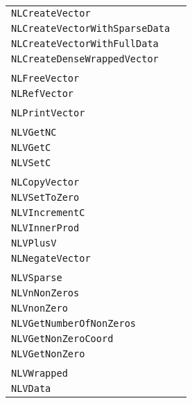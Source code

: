 \documentclass[12pt]{article}
\begin{document}
\begin{center}
\begin{tabular}{ll}
\tt NLCreateVector&\pageref{Subroutine:NLCreateVector}\\
\tt NLCreateVectorWithSparseData&\pageref{Subroutine:NLCreateVectorWithSparseData}\\
\tt NLCreateVectorWithFullData&\pageref{Subroutine:NLCreateVectorWithFullData}\\
\tt NLCreateDenseWrappedVector&\pageref{Subroutine:NLCreateDenseWrappedVector}\\
\\
\tt NLFreeVector&\pageref{Subroutine:NLFreeVector}\\
\tt NLRefVector&\pageref{Subroutine:NLRefVector}\\
\\
\tt NLPrintVector&\pageref{Subroutine:NLPrintVector}\\
\\
\tt NLVGetNC&\pageref{Subroutine:NLVGetNC}\\
\tt NLVGetC&\pageref{Subroutine:NLVGetC}\\
\tt NLVSetC&\pageref{Subroutine:NLVSetC}\\
\\
\tt NLCopyVector&\pageref{Subroutine:NLCopyVector}\\
\tt NLVSetToZero&\pageref{Subroutine:NLVSetToZero}\\
\tt NLVIncrementC&\pageref{Subroutine:NLVIncrementC}\\
\tt NLVInnerProd&\pageref{Subroutine:NLVInnerProd}\\
\tt NLVPlusV&\pageref{Subroutine:NLVPlusV}\\
\tt NLNegateVector&\pageref{Subroutine:NLNegateVector}\\
\\
\tt NLVSparse&\pageref{Subroutine:NLVSparse}\\
\tt NLVnNonZeros&\pageref{Subroutine:NLVnNonZeros}\\
\tt NLVnonZero&\pageref{Subroutine:NLVnonZero}\\
\tt NLVGetNumberOfNonZeros&\pageref{Subroutine:NLVGetNumberOfNonZeros}\\
\tt NLVGetNonZeroCoord&\pageref{Subroutine:NLVGetNonZeroCoord}\\
\tt NLVGetNonZero&\pageref{Subroutine:NLVGetNonZero}\\
\\
\tt NLVWrapped&\pageref{Subroutine:NLVWrapped}\\
\tt NLVData&\pageref{Subroutine:NLVData}\\
\end{tabular}
\end{center}
\end{document}
